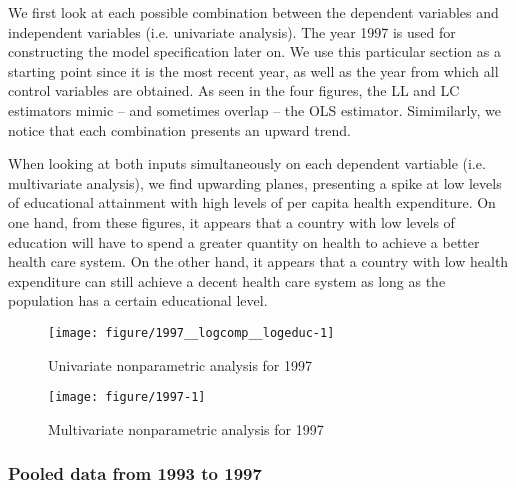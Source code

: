 \documentclass[12pt,a4paper]{article}\usepackage[]{graphicx}\usepackage[]{color}
\newenvironment{knitrout}{}{} %
\begin{document}
We first look at each possible combination between the dependent variables and independent variables (i.e. univariate analysis). The year 1997 is used for constructing the model specification later on. We use this particular section as a starting point since it is the most recent year, as well as the year from which all control variables are obtained. As seen in the four figures, the LL and LC estimators mimic -- and sometimes overlap -- the OLS estimator. Simimilarly, we notice that each combination presents an upward trend.

When looking at both inputs simultaneously on each dependent vartiable (i.e. multivariate analysis), we find upwarding planes, presenting a spike at low levels of educational attainment with high levels of per capita health expenditure. On one hand, from these figures, it appears that a country with low levels of education will have to spend a greater quantity on health to achieve a better health care system. On the other hand, it appears that a country with low health expenditure can still achieve a decent health care system as long as the population has a certain educational level.

\begin{knitrout}
\color{fgcolor}\begin{figure}[htbp]

{\centering \texttt{[image: figure/1997\_\_logcomp\_\_logeduc-1]} 

}

\caption[Univariate nonparametric analysis for 1997]{Univariate nonparametric analysis for 1997}\label{fig:1997, logcomp, logeduc}
\end{figure}


\end{knitrout}

\begin{knitrout}
\color{fgcolor}\begin{figure}[htbp]

{\centering \texttt{[image: figure/1997-1]} 

}

\caption[Multivariate nonparametric analysis for 1997]{Multivariate nonparametric analysis for 1997}\label{fig:1997}
\end{figure}


\end{knitrout}

\subsubsection{Pooled data from 1993 to 1997}
\end{document}

